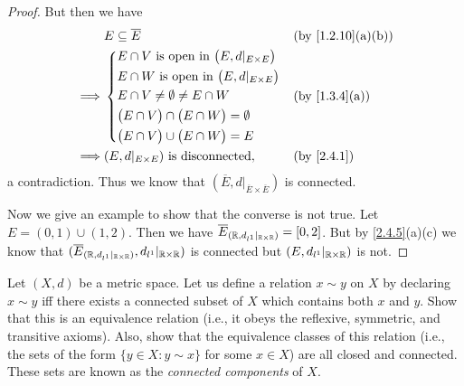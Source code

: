 \begin{proof}
  But then we have
  \begin{align*}
             & E \subseteq \overline{E}                                     &  & \text{(by \cref{1.2.10}(a)(b))} \\
    \implies & \begin{dcases}
                 E \cap V \text{ is open in } \big(E, d|_{E \times E}\big) \\
                 E \cap W \text{ is open in } \big(E, d|_{E \times E}\big) \\
                 E \cap V \neq \emptyset \neq E \cap W                     \\
                 \big(E \cap V\big) \cap \big(E \cap W\big) = \emptyset    \\
                 \big(E \cap V\big) \cup \big(E \cap W\big) = E
               \end{dcases} &  & \text{(by \cref{1.3.4}(a))}                                         \\
    \implies & (E, d|_{E \times E}) \text{ is disconnected},                &  & \by{2.4.1}
  \end{align*}
  a contradiction.
  Thus we know that \((\overline{E}, d|_{\overline{E} \times \overline{E}})\) is connected.

  Now we give an example to show that the converse is not true.
  Let \(E = (0, 1) \cup (1, 2)\).
  Then we have \(\overline{E}_{(\mathbb{R}, d_{l^1}|_{\mathbb{R} \times \mathbb{R}})} = [0, 2]\).
  But by \cref{2.4.5}(a)(c) we know that \((\overline{E}_{(\mathbb{R}, d_{l^1}|_{\mathbb{R} \times \mathbb{R}})}, d_{l^1}|_{\mathbb{R} \times \mathbb{R}})\) is connected but \((E, d_{l^1}|_{\mathbb{R} \times \mathbb{R}})\) is not.
\end{proof}

\begin{ex}\label{ex:2.4.9}
  Let \((X, d)\) be a metric space. Let us define a relation \(x \sim y\) on \(X\) by declaring \(x \sim y\) iff there exists a connected subset of \(X\) which contains both \(x\) and \(y\).
  Show that this is an equivalence relation (i.e., it obeys the reflexive, symmetric, and transitive axioms).
  Also, show that the equivalence classes of this relation (i.e., the sets of the form \(\{y \in  X : y \sim x\}\) for some \(x \in X\)) are all closed and connected.
  These sets are known as the \emph{connected components} of \(X\).
\end{ex}

